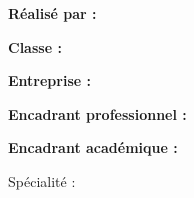 \begin{titlepage}
\begin{flushleft}
\hspace{2.5cm}\begin{minipage}{0.75\textwidth}
  \setlength{\parskip}{0.55em}
  {\large \textbf{Réalisé par :} \reportAuthor\par}
  {\large \textbf{Classe :} \reportClass\par}
  {\large \textbf{Entreprise :} \reportHostOrg\par}
  {\large \textbf{Encadrant professionnel :} \reportProfessionalSupervisor\par}
  {\large \textbf{Encadrant académique :} \reportAcademicSupervisor\par}
\end{minipage}
\end{flushleft}

\vfill
{\small \reportInstitution\par}
{\small Spécialité : \reportSpecialty\par}

\end{titlepage}
\setcounter{page}{2}
